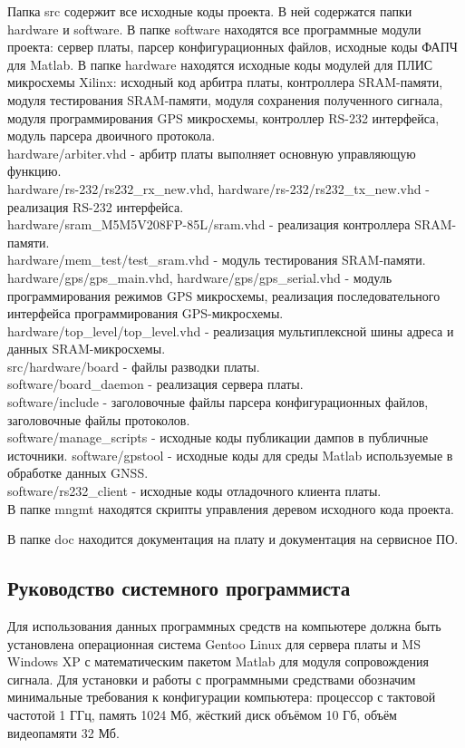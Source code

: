 Папка src содержит все исходные коды проекта. В ней содержатся папки hardware и software. В папке software находятся все программные модули проекта:
сервер платы, парсер конфигурационных файлов, исходные коды ФАПЧ для Matlab. В папке hardware находятся исходные коды модулей для ПЛИС микросхемы Xilinx:
исходный код арбитра платы, контроллера SRAM-памяти, модуля тестирования SRAM-памяти, модуля сохранения полученного сигнала, модуля программирования GPS
микросхемы, контроллер RS-232 интерфейса, модуль парсера двоичного протокола. \\
hardware/arbiter.vhd - арбитр платы выполняет основную управляющую функцию. \\
hardware/rs-232/rs232\_rx\_new.vhd, hardware/rs-232/rs232\_tx\_new.vhd - реализация RS-232 интерфейса. \\
hardware/sram\_M5M5V208FP-85L/sram.vhd - реализация контроллера SRAM-памяти. \\
hardware/mem\_test/test\_sram.vhd - модуль тестирования SRAM-памяти. \\
hardware/gps/gps\_main.vhd, hardware/gps/gps\_serial.vhd - модуль программирования режимов GPS микросхемы, реализация последовательного 
	интерфейса программирования GPS-микросхемы. \\
hardware/top\_level/top\_level.vhd - реализация мультиплексной шины адреса и данных SRAM-микросхемы. \\
src/hardware/board - файлы разводки платы. \\
software/board\_daemon - реализация сервера платы. \\
software/include - заголовочные файлы парсера конфигурационных файлов, заголовочные файлы протоколов. \\
software/manage\_scripts - исходные коды публикации дампов в публичные источники.
software/gpstool - исходные коды для среды Matlab используемые в обработке данных GNSS. \\
software/rs232\_client - исходные коды отладочного клиента платы. \\


В папке mngmt находятся скрипты управления деревом исходного кода проекта.

В папке doc находится документация на плату и документация на сервисное ПО.


\subsection{Руководство системного программиста}
Для использования данных программных средств на компьютере должна быть установлена операционная система Gentoo Linux для сервера платы и MS Windows XP с 
математическим пакетом Matlab для модуля сопровождения сигнала. 
Для установки и работы с программными средствами обозначим минимальные требования к конфигурации компьютера: процессор с тактовой частотой 1 ГГц, память 1024 Мб,
жёсткий диск объёмом 10 Гб, объём видеопамяти 32 Мб. 


